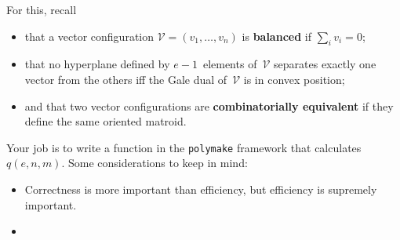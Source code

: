\documentclass[11pt]{amsart}
\newcommand{\VV}{\mathcal{V}}
\newcommand{\defn}[1]{\textbf{\color{blue}#1}} %
\begin{document}
For this, recall 
\begin{itemize}
\item that a vector configuration $\VV = (v_1,\dots,v_n)$ is \defn{balanced} if $\sum_i v_i=0$;
\item that no hyperplane defined by $e-1$~elements of~$\VV$ separates   exactly one vector from the others iff the Gale dual of~$\VV$ is in   convex position;
\item and that two vector configurations are \defn{combinatorially equivalent} if they define the same oriented matroid.
\end{itemize}

\bigskip
Your job is to write a function in the \texttt{polymake} framework that calculates $q(e,n,m)$. Some considerations to keep in mind:
\begin{itemize}
\item Correctness is more important than efficiency, but efficiency is supremely important.
\item 
\end{itemize}
\end{document}

